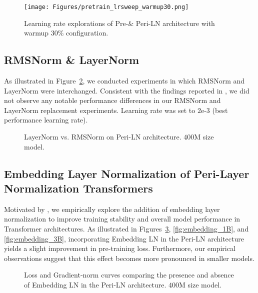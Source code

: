 \begin{figure}[ht!]
    \centering
    \texttt{[image: Figures/pretrain\_lrsweep\_warmup30.png]} 
    \caption{Learning rate explorations of Pre-\& Peri-LN architecture with warmup $30$\% configuration.}
    \label{fig:warmup30}
\end{figure}

\subsection{RMSNorm \& LayerNorm} \label{appendix:rmsnorm}
As illustrated in Figure~\ref{fig:layernorm}, we conducted experiments in which RMSNorm and LayerNorm were interchanged. Consistent with the findings reported in \citep{olmo2}, we did not observe any notable performance differences in our RMSNorm and LayerNorm replacement experiments. Learning rate was set to $2$e-$3$ (best performance learning rate).


\begin{figure}[ht!]
    \centering
    \caption{LayerNorm vs. RMSNorm on Peri-LN architecture. $400$M size model.}
    \label{fig:layernorm}
\end{figure}

\newpage

\subsection{Embedding Layer Normalization of Peri-Layer Normalization Transformers}\label{appendix:embeddingln}
Motivated by \citet{spikenomore}, we empirically explore the addition of embedding layer normalization to improve training stability and overall model performance in Transformer architectures. As illustrated in Figures~\ref{fig:embedding_400M}, \ref{fig:embedding_1B}, and \ref{fig:embedding_3B}, incorporating Embedding LN in the Peri-LN architecture yields a slight improvement in pre-training loss. Furthermore, our empirical observations suggest that this effect becomes more pronounced in smaller models.

\begin{figure}[ht!]
    \centering
    \caption{Loss and Gradient-norm curves comparing the presence and absence of Embedding LN in the Peri-LN architecture. $400$M size model.}
    \label{fig:embedding_400M}
\end{figure}


